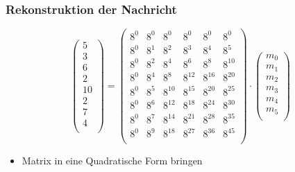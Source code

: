 \documentclass[11pt,aspectratio=169]{beamer}
\begin{document}
	\begin{frame}
		\frametitle{Rekonstruktion der Nachricht}
		
		\[
		\begin{pmatrix}
			5 \\ 3 \\ 6 \\ 2 \\ 10 \\ 2 \\ 7 \\ 4 \\
		\end{pmatrix}
		=
		\begin{pmatrix}
			8^0&    8^0&    8^0&    8^0&    8^0&    8^0\\
			8^0&	8^1&	8^2&	8^3&	8^4&	8^5\\
			8^0&	8^2&	8^4&	8^6&	8^8& 8^{10}\\
			8^0&	8^4&	8^8& 8^{12}& 8^{16}& 8^{20}\\
			8^0&	8^5& 8^{10}& 8^{15}& 8^{20}& 8^{25}\\
			8^0&	8^6& 8^{12}& 8^{18}& 8^{24}& 8^{30}\\
			8^0&	8^7& 8^{14}& 8^{21}& 8^{28}& 8^{35}\\
			8^0&	8^9& 8^{18}& 8^{27}& 8^{36}& 8^{45}\\
		\end{pmatrix}
		\cdot
		\begin{pmatrix}
			m_0 \\ m_1 \\ m_2 \\ m_3 \\ m_4 \\ m_5 \\
		\end{pmatrix}
		\]
		
		\vspace{5pt}
		
		\begin{itemize}
			\item Matrix in eine Quadratische Form bringen
		\end{itemize}
		
	\end{frame}
\end{document}
